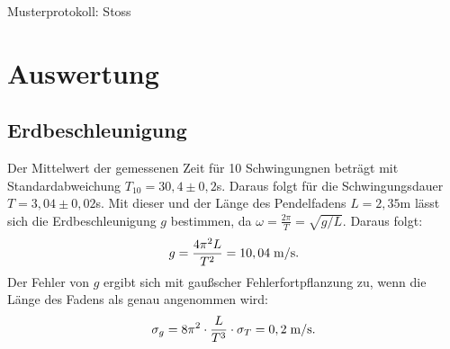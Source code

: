 \documentclass[oneside]{article}
\begin{document}
\thispagestyle{empty}
\centerline{ }

\normalsize

\begin{center}
Musterprotokoll: Stoss
\end{center}
\newpage

\section{Auswertung}
\subsection*{Erdbeschleunigung}
Der Mittelwert der gemessenen Zeit für 10 Schwingungnen beträgt mit Standardabweichung $T_{10}= 30,4\pm 0,2$\;s. Daraus folgt für die Schwingungsdauer $T=3,04\pm 0,02$\;s. Mit dieser und der Länge des Pendelfadens $L=2,35$\;m lässt sich die Erdbeschleunigung $g$ bestimmen, da $\omega=\frac{2\pi}{T}=\sqrt{g/L}$. Daraus folgt:\\
\begin{align*}
g=\frac{4\pi^2 L}{T^2}=10,04\; \rm{m/s}.
\end{align*} 
Der Fehler von $g$ ergibt sich mit gaußscher Fehlerfortpflanzung zu, wenn die Länge des Fadens als genau angenommen wird:
\begin{align*}
\sigma_{g}=8\pi^{2}\cdot\frac{L}{T^3}\cdot\sigma_{T}=0,2\;\rm{m/s}.
\end{align*}
\end{document}
